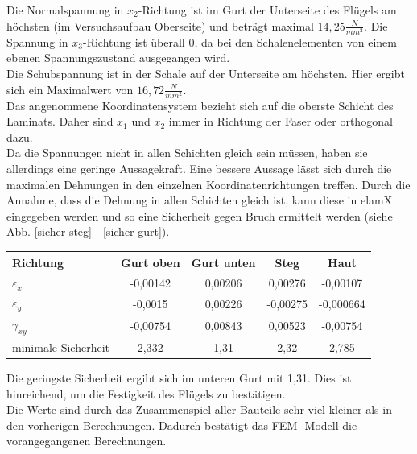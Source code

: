 Die Normalspannung in $x_{2}$-Richtung ist im Gurt der Unterseite des Flügels am höchsten (im Versuchsaufbau Oberseite) und beträgt maximal $14,25\frac{N}{mm^2}$. Die Spannung in $x_{3}$-Richtung ist überall 0, da bei den Schalenelementen von einem ebenen Spannungszustand ausgegangen wird.\\
Die Schubspannung ist in der Schale auf der Unterseite am höchsten. Hier ergibt sich ein Maximalwert von $16,72\frac{N}{mm^2}$.\\
\noindent Das angenommene Koordinatensystem bezieht sich auf die oberste Schicht des Laminats. Daher sind $x_{1}$ und $x_{2}$ immer in Richtung der Faser oder orthogonal dazu.\\
Da die Spannungen nicht in allen Schichten gleich sein müssen, haben sie allerdings eine geringe Aussagekraft. Eine bessere Aussage lässt sich durch die maximalen Dehnungen in den einzelnen Koordinatenrichtungen treffen. Durch die Annahme, dass die Dehnung in allen Schichten gleich ist, kann diese in elamX eingegeben werden und so eine Sicherheit gegen Bruch ermittelt werden
(siehe Abb. \ref{sicher-steg} - \ref{sicher-gurt}).
\begin{center}
\begin{tabular}[h]{l|c|c|c|c}
Richtung&Gurt oben&Gurt unten&Steg&Haut\\
\hline
$\varepsilon_{x}$&-0,00142&0,00206&0,00276&-0,00107\\
$\varepsilon_{y}$&-0,0015&0,00226&-0,00275&-0,000664\\
$\gamma_{xy}$&-0,00754&0,00843&0,00523&-0,00754\\
minimale Sicherheit&2,332&1,31&2,32&2,785
\end{tabular}
\end{center}

\noindent Die geringste Sicherheit ergibt sich im unteren Gurt mit 1,31. Dies ist hinreichend, um die Festigkeit des Flügels zu bestätigen.\\
\noindent
Die Werte sind durch das Zusammenspiel aller Bauteile sehr viel kleiner als in den vorherigen Berechnungen. Dadurch bestätigt das FEM- Modell die vorangegangenen Berechnungen.
\newpage
